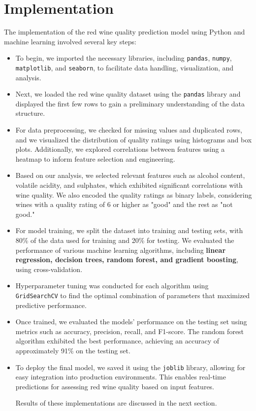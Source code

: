 \documentclass{article}
\begin{document}
\section{Implementation}

The implementation of the red wine quality prediction model using Python and machine learning involved several key steps:

\begin{itemize}
  \item To begin, we imported the necessary libraries, including \texttt{pandas}, \texttt{numpy}, \texttt{matplotlib}, and \texttt{seaborn}, to facilitate data handling, visualization, and analysis.
  
  \item Next, we loaded the red wine quality dataset using the \texttt{pandas} library and displayed the first few rows to gain a preliminary understanding of the data structure.
  
  \item For data preprocessing, we checked for missing values and duplicated rows, and we visualized the distribution of quality ratings using histograms and box plots. Additionally, we explored correlations between features using a heatmap to inform feature selection and engineering.
  
  \item Based on our analysis, we selected relevant features such as alcohol content, volatile acidity, and sulphates, which exhibited significant correlations with wine quality. We also encoded the quality ratings as binary labels, considering wines with a quality rating of 6 or higher as "good" and the rest as "not good."
  
  \item For model training, we split the dataset into training and testing sets, with 80\% of the data used for training and 20\% for testing. We evaluated the performance of various machine learning algorithms, including \textbf{linear regression, decision trees, random forest, and gradient boosting}, using cross-validation.
  
  \item Hyperparameter tuning was conducted for each algorithm using \texttt{GridSearchCV} to find the optimal combination of parameters that maximized predictive performance.
  
  \item Once trained, we evaluated the models' performance on the testing set using metrics such as accuracy, precision, recall, and F1-score. The random forest algorithm exhibited the best performance, achieving an accuracy of approximately 91\% on the testing set.
  
  \item To deploy the final model, we saved it using the \texttt{joblib} library, allowing for easy integration into production environments. This enables real-time predictions for assessing red wine quality based on input features.

  
  Results of these implementations are discussed in the next section.
\end{itemize}
\end{document}
